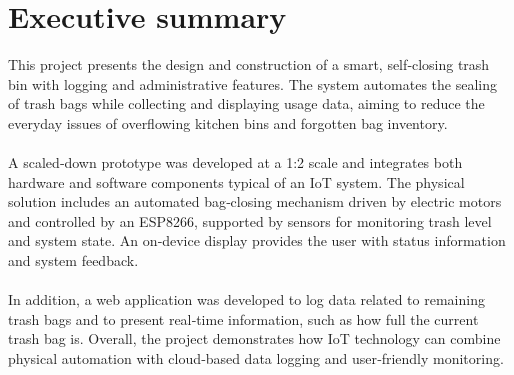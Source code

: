 \documentclass{article}
\begin{document}
\fi

\section{Executive summary}
\label{sec:executive-summary}

This project presents the design and construction of a smart, self‑closing trash bin with logging and administrative features. The system automates the sealing of trash bags while collecting and displaying usage data, aiming to reduce the everyday issues of overflowing kitchen bins and forgotten bag inventory.
\\ \\
\noindent
A scaled‑down prototype was developed at a 1:2 scale and integrates both hardware and software components typical of an IoT system. The physical solution includes an automated bag‑closing mechanism driven by electric motors and controlled by an ESP8266, supported by sensors for monitoring trash level and system state. An on‑device display provides the user with status information and system feedback.
\\ \\
\noindent
In addition, a web application was developed to log data related to remaining trash bags and to present real‑time information, such as how full the current trash bag is. Overall, the project demonstrates how IoT technology can combine physical automation with cloud‑based data logging and user‑friendly monitoring.

\ifdefined\mainfile\else
\end{document}
